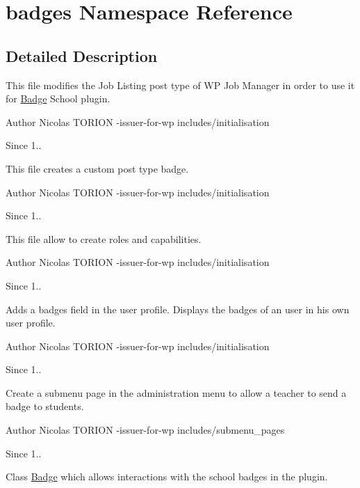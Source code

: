 \hypertarget{namespacebadges}{}\section{badges Namespace Reference}
\label{namespacebadges}


\subsection{Detailed Description}
This file modifies the Job Listing post type of WP Job Manager in order to use it for \hyperlink{class_badge}{Badge} School plugin.

\begin{DoxyAuthor}{Author}
Nicolas T\+O\+R\+I\+ON -\/issuer-\/for-\/wp  includes/initialisation 
\end{DoxyAuthor}
\begin{DoxySince}{Since}
1..
\end{DoxySince}
This file creates a custom post type badge.

\begin{DoxyAuthor}{Author}
Nicolas T\+O\+R\+I\+ON -\/issuer-\/for-\/wp  includes/initialisation 
\end{DoxyAuthor}
\begin{DoxySince}{Since}
1..
\end{DoxySince}
This file allow to create roles and capabilities.

\begin{DoxyAuthor}{Author}
Nicolas T\+O\+R\+I\+ON -\/issuer-\/for-\/wp  includes/initialisation 
\end{DoxyAuthor}
\begin{DoxySince}{Since}
1..
\end{DoxySince}
Adds a badges field in the user profile. Displays the badges of an user in his own user profile.

\begin{DoxyAuthor}{Author}
Nicolas T\+O\+R\+I\+ON -\/issuer-\/for-\/wp  includes/initialisation 
\end{DoxyAuthor}
\begin{DoxySince}{Since}
1..
\end{DoxySince}
Create a submenu page in the administration menu to allow a teacher to send a badge to students.

\begin{DoxyAuthor}{Author}
Nicolas T\+O\+R\+I\+ON -\/issuer-\/for-\/wp  includes/submenu\+\_\+pages 
\end{DoxyAuthor}
\begin{DoxySince}{Since}
1..
\end{DoxySince}
Class \hyperlink{class_badge}{Badge} which allows interactions with the school badges in the plugin.

